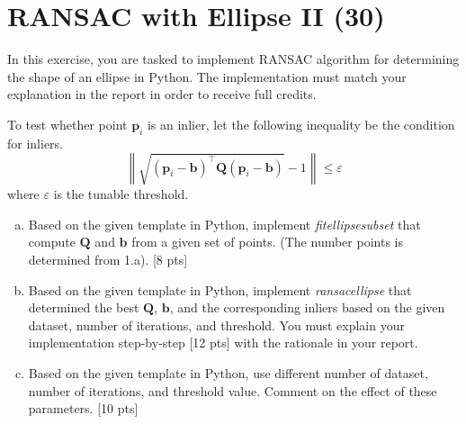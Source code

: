 \section{RANSAC with Ellipse II (30)}
In this exercise, you are tasked to implement RANSAC algorithm for determining the shape of an ellipse in Python. The implementation must match your explanation in the report in order to receive full credits.

To test whether point $\mathbf{p}_i$ is an inlier, let the following inequality be the condition for inliers.
\begin{equation*}
    \left\|\sqrt{(\mathbf{p}_i-\mathbf{b})^\top\mathbf{Q}(\mathbf{p}_i-\mathbf{b})}-1\right\|\leq \varepsilon
\end{equation*}
where $\varepsilon$ is the tunable threshold.
\begin{enumerate}[a.)]
\item Based on the given template in Python, implement \textit{fit\textunderscore ellipse\textunderscore subset} that compute $\mathbf{Q}$ and $\mathbf{b}$ from a given set of points. (The number points is determined from 1.a). [8 pts]

\item Based on the given template in Python, implement \textit{ransac\textunderscore ellipse} that determined the best $\mathbf{Q}$, $\mathbf{b}$, and the corresponding inliers based on the given dataset, number of iterations, and threshold. You must explain your implementation step-by-step [12 pts]
 with the rationale in your report.
\item Based on the given template in Python, use different number of dataset, number of iterations, and threshold value. Comment on the effect of these parameters. [10 pts]
\end{enumerate}